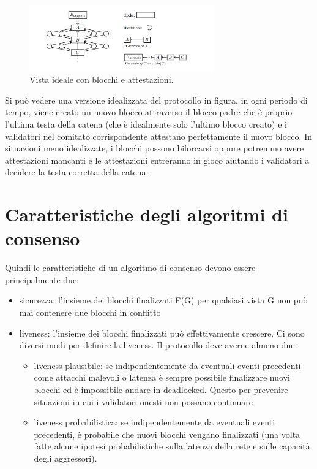 \documentclass[a4paper,11pt]{report}
\begin{document}
\begin{figure}[htbp] 
\begin{center}
\includegraphics[width=8cm]{img/imgPoS.png} 
\end{center}
\caption{Vista ideale con blocchi e attestazioni.}
\end{figure}

Si può vedere una versione idealizzata del protocollo in figura, in ogni periodo di tempo, viene creato un nuovo blocco attraverso il blocco padre che è proprio l'ultima testa della catena (che è idealmente solo l'ultimo blocco creato) e i validatori nel comitato corrispondente attestano perfettamente il nuovo blocco. In situazioni meno idealizzate, i blocchi possono biforcarsi oppure potremmo avere attestazioni mancanti e le attestazioni entreranno in gioco aiutando i validatori a decidere la testa corretta della catena.

\section{Caratteristiche degli algoritmi di consenso}
Quindi le caratteristiche di un algoritmo di consenso devono essere principalmente due:
\begin{itemize}
\item sicurezza: l'insieme dei blocchi finalizzati F(G) per qualsiasi vista G non può mai contenere due blocchi in conflitto
\item liveness: l'insieme dei blocchi finalizzati può effettivamente crescere. Ci sono diversi modi per definire la liveness. Il protocollo deve averne almeno due:
\begin{itemize}
\item liveness plausibile: se indipendentemente da eventuali eventi precedenti come attacchi malevoli o latenza è sempre possibile finalizzare nuovi blocchi ed è impossibile andare in deadlocked. Questo per prevenire situazioni in cui i validatori onesti non possano continuare
\item liveness probabilistica: se indipendentemente da eventuali eventi precedenti, è probabile che nuovi blocchi vengano finalizzati (una volta fatte alcune ipotesi probabilistiche sulla latenza della rete e sulle capacità degli aggressori).
\end{itemize}
\end{itemize}
\end{document}
